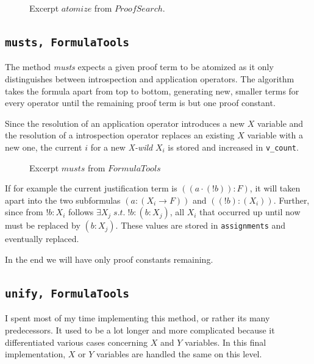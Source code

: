 \begin{figure}[H]
    \vspace{-10pt}
	
	\vspace{-10pt}
	\caption{Excerpt $atomize$ from $ProofSearch$.}
\end{figure}

\subsection[musts]{\texttt{musts, FormulaTools}}
The method \emph{musts} expects a given proof term to be atomized as it only distinguishes between introspection and application operators.
The algorithm takes the formula apart from top to bottom, generating new, smaller terms for every operator until the remaining proof term is but one proof constant. 

Since the resolution of an application operator introduces a new $X$ variable and the resolution of a introspection operator replaces an existing $X$ variable with a new one, the current $i$ for a new \emph{X-wild} $X_i$ is stored and increased in \texttt{v\_count}.

\begin{figure}[H]
    \vspace{-10pt}
	
	\vspace{-10pt}
	\caption{Excerpt $musts$ from $FormulaTools$}
\end{figure}

If for example the current justification term is $((a\cdot (!b)):F)$, it will taken apart into the two subformulas $(a:(X_i\rightarrow F))$ and $((!b):(X_i))$. Further, since from $!b:X_i$ follows $\exists X_j \; s.t. \; !b:(b:X_j)$, all $X_i$ that occurred up until now must be replaced by $(b:X_j)$. These values are stored in \texttt{assignments} and eventually replaced.

In the end we will have only proof constants remaining.

\subsection[unify]{\texttt{unify, FormulaTools}}
I spent most of my time implementing this method, or rather its many predecessors. It used to be a lot longer and more complicated because it differentiated various cases concerning $X$ and $Y$ variables. In this final implementation, $X$ or $Y$ variables are handled the same on this level.

